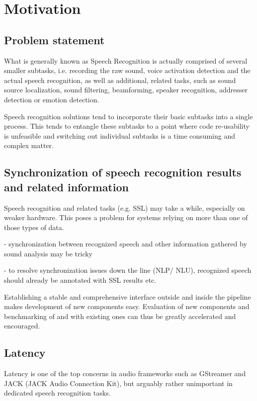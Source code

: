 
\chapter{Motivation}

\section{Problem statement} 
What is generally known as Speech Recognition is actually comprised of several smaller subtasks, i.e. recording the raw sound, voice activation detection and the actual speech recognition, as well as additional, related tasks, such as sound source localization, sound filtering, beamforming, speaker recognition, addresser detection or emotion detection. %

Speech recognition solutions tend to incorporate their basic subtasks into a single process.
This tends to entangle these subtasks to a point where code re-usability is unfeasible and switching out individual subtasks is a time consuming and complex matter.

\section{Synchronization of speech recognition results and related information}

Speech recognition and related tasks (e.g. SSL) may take a while, especially on weaker hardware. 
This poses a problem for systems relying on more than one of those types of data. 

- synchronization between recognized speech and other information gathered by sound analysis may be tricky

- to resolve synchronization issues down the line (NLP/ NLU), recognized speech should already be annotated with SSL results etc.

Establishing a stable and comprehensive interface outside and inside the pipeline makes development of new components easy. 
Evaluation of new components and benchmarking of and with existing ones can thus be greatly accelerated and encouraged.%

\section{Latency}
Latency is one of the top concerns in audio frameworks such as GStreamer and JACK (JACK Audio Connection Kit), but arguably rather unimportant in dedicated speech recognition tasks. 
	
